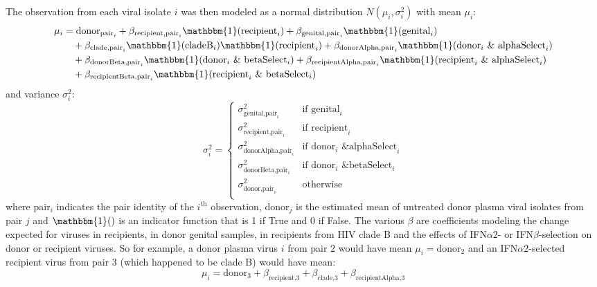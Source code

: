 \documentclass[12pt]{article}
\newcommand{\ifna}{IFN${\alpha 2}$}
\newcommand{\ifnb}{IFN${\beta}$}
\begin{document}
The observation from each viral isolate $i$ was then modeled as a normal distribution $N(\mu_i,\sigma^2_i)$ with mean $\mu_i$:
\begin{align*}
  \mu_i&= \text{donor}_{\text{pair}_i} + \beta_{\text{recipient,pair}_i} \mathbbm{1}(\text{recipient}_i) + \beta_{\text{genital,pair}_i} \mathbbm{1}(\text{genital}_i)\\
  &\quad+ \beta_{\text{clade,pair}_i} \mathbbm{1}(\text{cladeB}_i)\mathbbm{1}(\text{recipient}_i) + \beta_{\text{donorAlpha,pair}_i} \mathbbm{1}(\text{donor}_i \text{ \& alphaSelect}_i)\\
  &\quad + \beta_{\text{donorBeta,pair}_i} \mathbbm{1}(\text{donor}_i \text{ \& betaSelect}_i) + \beta_{\text{recipientAlpha,pair}_i} \mathbbm{1}(\text{recipient}_i\text{ \& alphaSelect}_i)\\
  &\quad+ \beta_{\text{recipientBeta,pair}_i} \mathbbm{1}(\text{recipient}_i \text{ \& betaSelect}_i) \\
\end{align*}
and variance $\sigma^2_i$:
\[
  \sigma^2_i = \begin{cases}
    \sigma^2_{\text{genital,pair}_i} & \text{if } \text{genital}_i\\
    \sigma^2_{\text{recipient,pair}_i} & \text{if } \text{recipient}_i\\
    \sigma^2_{\text{donorAlpha,pair}_i} & \text{if } \text{donor}_i \text{ \& alphaSelect}_i\\
    \sigma^2_{\text{donorBeta,pair}_i} & \text{if } \text{donor}_i \text{ \& betaSelect}_i\\
    \sigma^2_{\text{donor,pair}_i} & \text{otherwise}\\
  \end{cases}
\]
where pair$_i$ indicates the pair identity of the $i^\text{th}$ observation,
  $\text{donor}_j$ is the estimated mean of untreated donor plasma viral isolates from pair $j$
  and $\mathbbm{1}()$ is an indicator function that is 1 if True and 0 if False.
  The various $\beta$ are coefficients modeling the change expected for viruses in recipients, in donor genital samples,
  in recipients from HIV clade B and the effects of \ifna{}- or \ifnb{}-selection on donor or recipient viruses.
  So for example, a donor plasma virus $i$ from pair 2 would have mean $\mu_i = \text{donor}_{2}$
  and an \ifna{}-selected recipient virus from pair 3 (which happened to be clade B) would have mean:
\[\mu_i=\text{donor}_{3} + \beta_{\text{recipient,3}} + \beta_{\text{clade,3}} + \beta_{\text{recipientAlpha,3}}\]
\end{document}
